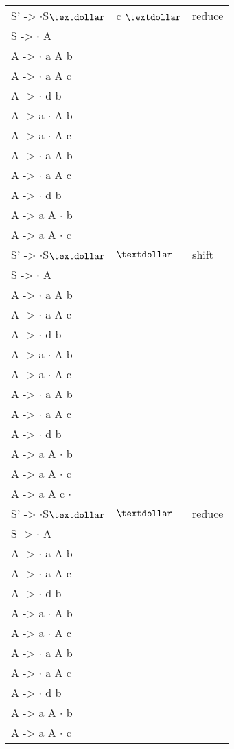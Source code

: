 \begin{latin}
\begin{tabular}{ | m{5cm} | m{5cm} | m{5cm} |  } \hline
S' -> {$\cdot$}S{$\textdollar$} & c {$\textdollar$} & reduce  \\ 
S -> {$\cdot$} A & & \\ 
A -> {$\cdot$} a A b & & \\
A -> {$\cdot$} a A c & & \\
A -> {$\cdot$} d b & & \\
A -> a {$\cdot$} A b & &\\ 
A -> a {$\cdot$} A c & & \\ 
A -> {$\cdot$} a A b & & \\
A -> {$\cdot$} a A c & & \\
A -> {$\cdot$} d b & & \\
A -> a A {$\cdot$} b & & \\
A -> a A {$\cdot$} c & & \\ \hline

S' -> {$\cdot$}S{$\textdollar$} & {$\textdollar$} & shift \\ 
S -> {$\cdot$} A & & \\ 
A -> {$\cdot$} a A b & & \\
A -> {$\cdot$} a A c & & \\
A -> {$\cdot$} d b & & \\
A -> a {$\cdot$} A b & &\\ 
A -> a {$\cdot$} A c & & \\ 
A -> {$\cdot$} a A b & & \\
A -> {$\cdot$} a A c & & \\
A -> {$\cdot$} d b & & \\
A -> a A {$\cdot$} b & & \\
A -> a A {$\cdot$} c & & \\
A -> a A c {$\cdot$}  & & \\ \hline

S' -> {$\cdot$}S{$\textdollar$} & {$\textdollar$} & reduce \\ 
S -> {$\cdot$} A & & \\ 
A -> {$\cdot$} a A b & & \\
A -> {$\cdot$} a A c & & \\
A -> {$\cdot$} d b & & \\
A -> a {$\cdot$} A b & &\\ 
A -> a {$\cdot$} A c & & \\ 
A -> {$\cdot$} a A b & & \\
A -> {$\cdot$} a A c & & \\
A -> {$\cdot$} d b & & \\
A -> a A {$\cdot$} b & & \\
A -> a A {$\cdot$} c & & \\
\end{tabular}
\end{latin}